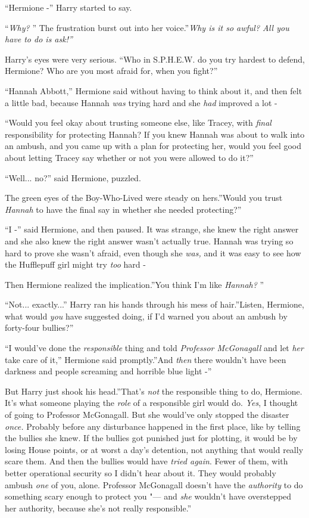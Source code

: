 ``Hermione -'' Harry started to say.

``\emph{Why?} '' The frustration burst out into her voice.''\emph{Why is
it so awful? All you have to do is ask!''}

Harry's eyes were very serious. ``Who in S.P.H.E.W. do you try hardest
to defend, Hermione? Who are you most afraid for, when you fight?''

``Hannah Abbott,'' Hermione said without having to think about it, and
then felt a little bad, because Hannah \emph{was} trying hard and she
\emph{had} improved a lot -

``Would you feel okay about trusting someone else, like Tracey, with
\emph{final} responsibility for protecting Hannah? If you knew Hannah
was about to walk into an ambush, and you came up with a plan for
protecting her, would you feel good about letting Tracey say whether or
not you were allowed to do it?''

``Well... no?'' said Hermione, puzzled.

The green eyes of the Boy-Who-Lived were steady on hers.''Would you
trust \emph{Hannah} to have the final say in whether she needed
protecting?''

``I -'' said Hermione, and then paused. It was strange, she knew the
right answer and she also knew the right answer wasn't actually true.
Hannah was trying so hard to prove she wasn't afraid, even though she
\emph{was,} and it was easy to see how the Hufflepuff girl might try
\emph{too} hard -

Then Hermione realized the implication.''You think I'm like
\emph{Hannah?} ''

``Not... exactly...'' Harry ran his hands through his mess of
hair.''Listen, Hermione, what would \emph{you} have suggested doing, if
I'd warned you about an ambush by forty-four bullies?''

``I would've done the \emph{responsible} thing and told \emph{Professor
McGonagall} and let \emph{her} take care of it,'' Hermione said
promptly.''And \emph{then} there wouldn't have been darkness and people
screaming and horrible blue light -''

But Harry just shook his head.''That's \emph{not} the responsible thing
to do, Hermione. It's what someone playing the \emph{role} of a
responsible girl would do. \emph{Yes}, I thought of going to Professor
McGonagall. But she would've only stopped the disaster \emph{once.}
Probably before any disturbance happened in the first place, like by
telling the bullies she knew. If the bullies got punished just for
plotting, it would be by losing House points, or at worst a day's
detention, not anything that would really scare them. And then the
bullies would have \emph{tried again}. Fewer of them, with better
operational security so I didn't hear about it. They would probably
ambush \emph{one} of you, alone. Professor McGonagall doesn't have the
\emph{authority} to do something scary enough to protect you "--- and
\emph{she} wouldn't have overstepped her authority, because she's not
really responsible.''

